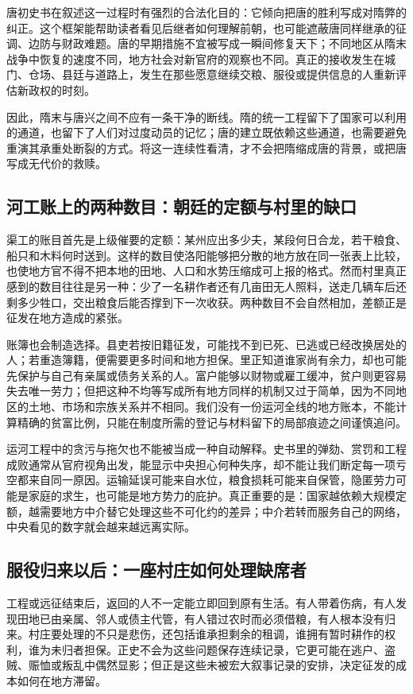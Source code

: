 唐初史书在叙述这一过程时有强烈的合法化目的：它倾向把唐的胜利写成对隋弊的纠正。这个框架能帮助读者看见后继者如何理解前朝，也可能遮蔽唐同样继承的征调、边防与财政难题。唐的早期措施不宜被写成一瞬间修复天下；不同地区从隋末战争中恢复的速度不同，地方社会对新官府的观察也不同。真正的接收发生在城门、仓场、县廷与道路上，发生在那些愿意继续交粮、服役或提供信息的人重新评估新政权的时刻。

因此，隋末与唐兴之间不应有一条干净的断线。隋的统一工程留下了国家可以利用的通道，也留下了人们对过度动员的记忆；唐的建立既依赖这些通道，也需要避免重演其承重处断裂的方式。将这一连续性看清，才不会把隋缩成唐的背景，或把唐写成无代价的救赎。

\subsection{河工账上的两种数目：朝廷的定额与村里的缺口}
渠工的账目首先是上级催要的定额：某州应出多少夫，某段何日合龙，若干粮食、船只和木料何时送到。这样的数目使洛阳能够把分散的地方放在同一张表上比较，也使地方官不得不把本地的田地、人口和水势压缩成可上报的格式。然而村里真正感到的数目往往是另一种：少了一名耕作者还有几亩田无人照料，送走几辆车后还剩多少牲口，交出粮食后能否撑到下一次收获。两种数目不会自然相加，差额正是征发在地方造成的紧张。

账簿也会制造选择。县吏若按旧籍征发，可能找不到已死、已逃或已经改换居处的人；若重造簿籍，便需要更多时间和地方担保。里正知道谁家尚有余力，却也可能先保护与自己有亲属或债务关系的人。富户能够以财物或雇工缓冲，贫户则更容易失去唯一劳力；但把这种不均等写成所有地方同样的机制又过于简单，因为不同地区的土地、市场和宗族关系并不相同。我们没有一份运河全线的地方账本，不能计算精确的贫富比例，只能在制度所需的登记与材料留下的局部痕迹之间谨慎追问。

运河工程中的贪污与拖欠也不能被当成一种自动解释。史书里的弹劾、赏罚和工程成败通常从官府视角出发，能显示中央担心何种失序，却不能让我们断定每一项亏空都来自同一原因。运输延误可能来自水位，粮食损耗可能来自保管，隐匿劳力可能是家庭的求生，也可能是地方势力的庇护。真正重要的是：国家越依赖大规模定额，越需要地方中介替它处理这些不可化约的差异；中介若转而服务自己的网络，中央看见的数字就会越来越远离实际。

\subsection{服役归来以后：一座村庄如何处理缺席者}
工程或远征结束后，返回的人不一定能立即回到原有生活。有人带着伤病，有人发现田地已由亲属、邻人或债主代管，有人错过农时而必须借粮，有人根本没有归来。村庄要处理的不只是悲伤，还包括谁承担剩余的租调，谁拥有暂时耕作的权利，谁为未归者担保。正史不会为这些问题保存连续记录，它更可能在逃户、盗贼、赈恤或叛乱中偶然显影；但正是这些未被宏大叙事记录的安排，决定征发的成本如何在地方滞留。


